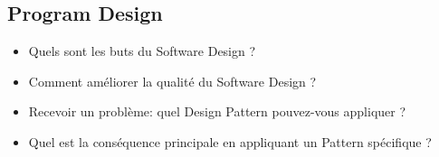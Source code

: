 \subsection{Program Design}


\begin{itemize}
	\item Quels sont les buts du Software Design ?
	\item Comment améliorer la qualité du Software Design ?
	\item Recevoir un problème: quel Design Pattern pouvez-vous appliquer ?
	\item Quel est la conséquence principale en appliquant un Pattern spécifique ?
\end{itemize}